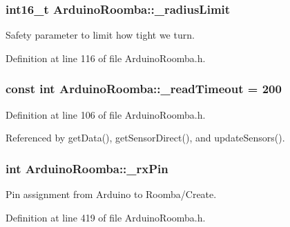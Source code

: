 \hypertarget{class_arduino_roomba_a218508bb243811c9b366cb8cdd2cd04b}{
\subsubsection[{\_\-radiusLimit}]{\setlength{\rightskip}{0pt plus 5cm}int16\_\-t {\bf ArduinoRoomba::\_\-radiusLimit}}}
\label{class_arduino_roomba_a218508bb243811c9b366cb8cdd2cd04b}


Safety parameter to limit how tight we turn. 



Definition at line 116 of file ArduinoRoomba.h.

\hypertarget{class_arduino_roomba_a8c8b81634e4b3549173cdb30db6ad70a}{
\subsubsection[{\_\-readTimeout}]{\setlength{\rightskip}{0pt plus 5cm}const int {\bf ArduinoRoomba::\_\-readTimeout} = 200}}
\label{class_arduino_roomba_a8c8b81634e4b3549173cdb30db6ad70a}


Definition at line 106 of file ArduinoRoomba.h.



Referenced by getData(), getSensorDirect(), and updateSensors().

\hypertarget{class_arduino_roomba_afd287b867c31071c4ae3409b4cf08c5e}{
\subsubsection[{\_\-rxPin}]{\setlength{\rightskip}{0pt plus 5cm}int {\bf ArduinoRoomba::\_\-rxPin}}}
\label{class_arduino_roomba_afd287b867c31071c4ae3409b4cf08c5e}


Pin assignment from Arduino to Roomba/Create. 



Definition at line 419 of file ArduinoRoomba.h.



